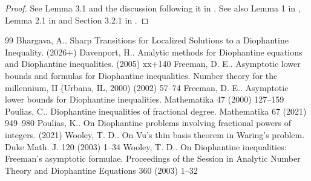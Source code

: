 \documentclass[10pt,a4paper]{amsart}
\numberwithin{equation}{section}
\begin{document}
\begin{proof} See Lemma 3.1 and the discussion following it in \cite{Bharloc}. See also Lemma 1 in \cite{FreemanAsymp}, Lemma 2.1 in \cite{Poulias1} and Section 3.2.1 in \cite{Poulthesis}. 
\end{proof}

\begin{thebibliography}{99}
 Bhargava, A.. Sharp Transitions for Localized Solutions to a {D}iophantine Inequality. (2026+)
 Davenport, H.. Analytic methods for {D}iophantine equations and {D}iophantine inequalities. (2005) xx+140
 Freeman, D. E.. Asymptotic lower bounds and formulas for {D}iophantine inequalities. Number theory for the millennium, {II} ({U}rbana, {IL}, 2000) (2002) 57--74
 Freeman, D. E.. Asymptotic lower bounds for {D}iophantine inequalities. Mathematika 47 (2000) 127--159
 Poulias, C.. Diophantine inequalities of fractional degree. Mathematika 67 (2021) 949--980
 Poulias, K.. On {D}iophantine problems involving fractional powers of integers. (2021)
 Wooley, T. D.. On {V}u's thin basis theorem in {W}aring's problem. Duke Math. J. 120 (2003) 1--34
 Wooley, T. D.. On {D}iophantine inequalities: {F}reeman's asymptotic formulae. Proceedings of the {S}ession in {A}nalytic {N}umber {T}heory and {D}iophantine {E}quations 360 (2003) 1--32
\end{thebibliography}
\end{document}
